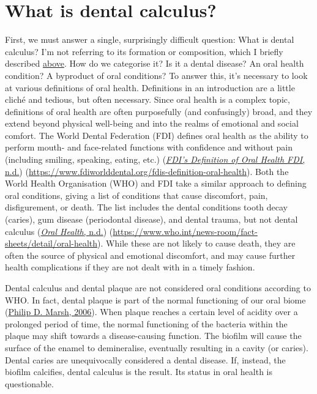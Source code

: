 \documentclass[
  letterpaper,
]{book}
\begin{document}
\hypertarget{intro-what}{%
\section{What is dental calculus?}\label{intro-what}}

First, we must answer a single, surprisingly difficult question: What is
dental calculus? I'm not referring to its formation or composition,
which I briefly described \protect\hyperlink{intro}{above}. How do we
categorise it? Is it a dental disease? An oral health condition? A
byproduct of oral conditions? To answer this, it's necessary to look at
various definitions of oral health. Definitions in an introduction are a
little cliché and tedious, but often necessary. Since oral health is a
complex topic, definitions of oral health are often purposefully (and
confusingly) broad, and they extend beyond physical well-being and into
the realms of emotional and social comfort. The World Dental Federation
(FDI) defines oral health as the ability to perform mouth- and
face-related functions with confidence and without pain (including
smiling, speaking, eating, etc.)
(\protect\hyperlink{ref-fdiOralHealth}{\emph{{FDI}'s Definition of Oral
Health \textbar{} {FDI}}, n.d.})
(\url{https://www.fdiworlddental.org/fdis-definition-oral-health}). Both
the World Health Organisation (WHO) and FDI take a similar approach to
defining oral conditions, giving a list of conditions that cause
discomfort, pain, disfigurement, or death. The list includes the dental
conditions tooth decay (caries), gum disease (periodontal disease), and
dental trauma, but not dental calculus
(\protect\hyperlink{ref-whoOralHealth}{\emph{Oral Health}, n.d.})
(\url{https://www.who.int/news-room/fact-sheets/detail/oral-health}).
While these are not likely to cause death, they are often the source of
physical and emotional discomfort, and may cause further health
complications if they are not dealt with in a timely fashion.

Dental calculus and dental plaque are not considered oral conditions
according to WHO. In fact, dental plaque is part of the normal
functioning of our oral biome
(\protect\hyperlink{ref-marshDentalPlaque2006}{Philip D. Marsh, 2006}).
When plaque reaches a certain level of acidity over a prolonged period
of time, the normal functioning of the bacteria within the plaque may
shift towards a disease-causing function. The biofilm will cause the
surface of the enamel to demineralise, eventually resulting in a cavity
(or caries). Dental caries are unequivocally considered a dental
disease. If, instead, the biofilm calcifies, dental calculus is the
result. Its status in oral health is questionable.
\end{document}
